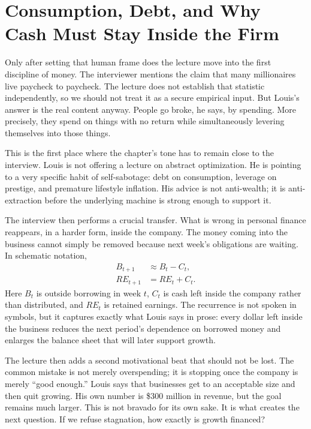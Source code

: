 \section{Consumption, Debt, and Why Cash Must Stay Inside the Firm}

Only after setting that human frame does the lecture move into the first discipline of money. The interviewer mentions the claim that many millionaires live paycheck to paycheck. The lecture does not establish that statistic independently, so we should not treat it as a secure empirical input. But Louis's answer is the real content anyway. People go broke, he says, by spending. More precisely, they spend on things with no return while simultaneously levering themselves into those things.

This is the first place where the chapter's tone has to remain close to the interview. Louis is not offering a lecture on abstract optimization. He is pointing to a very specific habit of self-sabotage: debt on consumption, leverage on prestige, and premature lifestyle inflation. His advice is not anti-wealth; it is anti-extraction before the underlying machine is strong enough to support it.

The interview then performs a crucial transfer. What is wrong in personal finance reappears, in a harder form, inside the company. The money coming into the business cannot simply be removed because next week's obligations are waiting. In schematic notation,
\begin{align}
B_{t+1} &\approx B_t - C_t,\\
RE_{t+1} &= RE_t + C_t.
\end{align}
Here \(B_t\) is outside borrowing in week \(t\), \(C_t\) is cash left inside the company rather than distributed, and \(RE_t\) is retained earnings. The recurrence is not spoken in symbols, but it captures exactly what Louis says in prose: every dollar left inside the business reduces the next period's dependence on borrowed money and enlarges the balance sheet that will later support growth.

The lecture then adds a second motivational beat that should not be lost. The common mistake is not merely overspending; it is stopping once the company is merely ``good enough.'' Louis says that businesses get to an acceptable size and then quit growing. His own number is \$300 million in revenue, but the goal remains much larger. This is not bravado for its own sake. It is what creates the next question. If we refuse stagnation, how exactly is growth financed?


